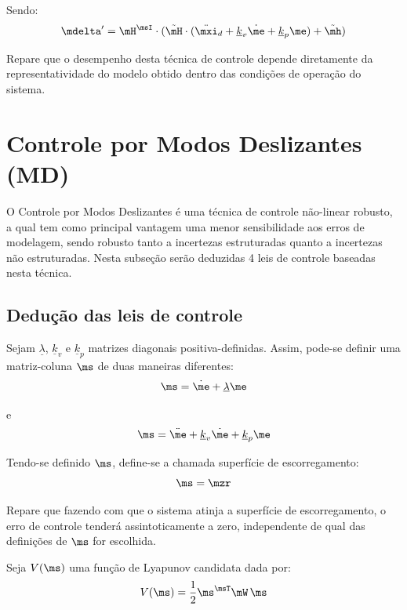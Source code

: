 \documentclass[]{politex}
\begin{document}
Sendo:
\begin{equation}
\mdelta' = \mH^\msI \cdot ( \tilde{\mH} \cdot (\ddot{\mxi}_d + \underline{k}_v \dot{\me} + \underline{k}_p \me ) + \tilde{\mh} )
\end{equation}

Repare que o desempenho desta técnica de controle depende diretamente da representatividade do modelo obtido dentro das condições de operação do sistema. 


\section{Controle por Modos Deslizantes (MD)} \label{sec:CMD}

O Controle por Modos Deslizantes é uma técnica de controle não-linear robusto, a qual tem como principal vantagem uma menor sensibilidade aos erros de modelagem, sendo robusto tanto a incertezas estruturadas quanto a incertezas não estruturadas. Nesta subseção serão deduzidas 4 leis de controle baseadas nesta técnica.

\subsection{Dedução das leis de controle}

Sejam $\underline{\lambda}$, $\underline{k}_v$ e $\underline{k}_p$ matrizes diagonais positiva-definidas. Assim, pode-se definir uma matriz-coluna $\ms$ de duas maneiras diferentes:
\begin{equation} \label{eq:SlidingSurfaces}
\ms = \dot{\me} + \underline{\lambda}\me
\end{equation}

e
\begin{equation} \label{eq:SlidingSurfaces_}
\ms = \ddot{\me} + \underline{k}_v\dot{\me} + \underline{k}_p\me
\end{equation}

Tendo-se definido $\ms$, define-se a chamada superfície de escorregamento:
\begin{equation} \label{eq:SuperficieDeEscorregamento}
\ms = \mzr
\end{equation}

Repare que fazendo com que o sistema atinja a superfície de escorregamento, o erro de controle tenderá assintoticamente a zero, independente de qual das definições de $\ms$ for escolhida.
 
Seja $V(\ms)$ uma função de Lyapunov candidata dada por:
\begin{equation}
V(\ms) = \frac{1}{2} \ms^\msT \mW \, \ms
\end{equation}
\end{document}
